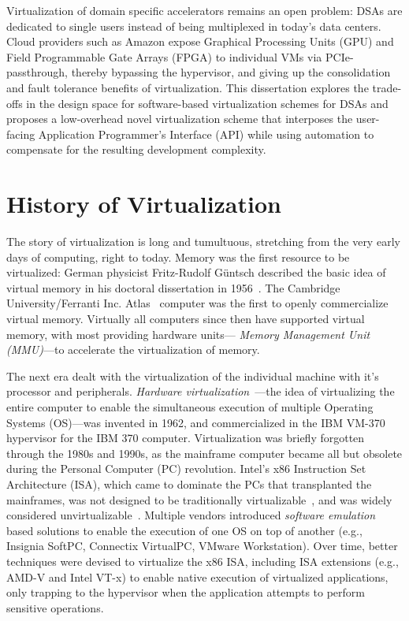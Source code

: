 Virtualization of domain specific accelerators remains an open problem:
DSAs are dedicated to single users instead of being multiplexed in today's
data centers. Cloud providers such as Amazon expose Graphical Processing Units
(GPU) and Field Programmable Gate Arrays (FPGA) to individual VMs via
PCIe-passthrough, thereby bypassing the hypervisor, and giving up the
consolidation and fault tolerance benefits of virtualization.
This dissertation explores the trade-offs in the design space for
software-based virtualization schemes for DSAs and proposes a low-overhead
novel virtualization scheme that interposes the user-facing Application
Programmer's Interface (API) while using automation to compensate for the
resulting development complexity.

\section{History of Virtualization}
The story of virtualization is long and tumultuous, stretching from the very
early days of computing, right to today.
Memory was the first resource to be virtualized:
German physicist Fritz-Rudolf Güntsch described the basic idea of
virtual memory in his doctoral dissertation in 1956~\cite{virtual-memory}.
The Cambridge University/Ferranti Inc. Atlas~\cite{atlas-vm} computer was the
first to openly commercialize virtual memory. Virtually all computers since
then have supported virtual memory, with most providing hardware units---\emph{
Memory Management Unit (MMU)}---to accelerate the virtualization of memory.

The next era dealt with the virtualization of the individual machine with it's
processor and peripherals.
\emph{Hardware virtualization}~\cite{cp40}---the idea of virtualizing the
entire computer to enable the simultaneous execution of multiple Operating
Systems (OS)---was invented in 1962, and commercialized in the IBM
VM-370~\cite{vm370} hypervisor for the IBM 370 computer.
Virtualization was briefly forgotten through the 1980s and 1990s, as the
mainframe computer became all but obsolete during the Personal Computer (PC)
revolution. Intel's x86 Instruction Set Architecture (ISA), which came to
dominate the PCs that transplanted the mainframes, was not designed to be
traditionally virtualizable~\cite{popek-goldberg}, and was widely considered
unvirtualizable~\cite{gelsinger-pc,bugnion-workstation}. Multiple vendors
introduced \emph{software emulation} based solutions to enable the execution
of one OS on top of another (e.g., Insignia SoftPC, Connectix VirtualPC,
VMware Workstation). Over time, better techniques were devised to virtualize
the x86 ISA, including ISA extensions (e.g., AMD-V and Intel VT-x) to enable
native execution of virtualized applications, only trapping to the hypervisor
when the application attempts to perform sensitive operations.

